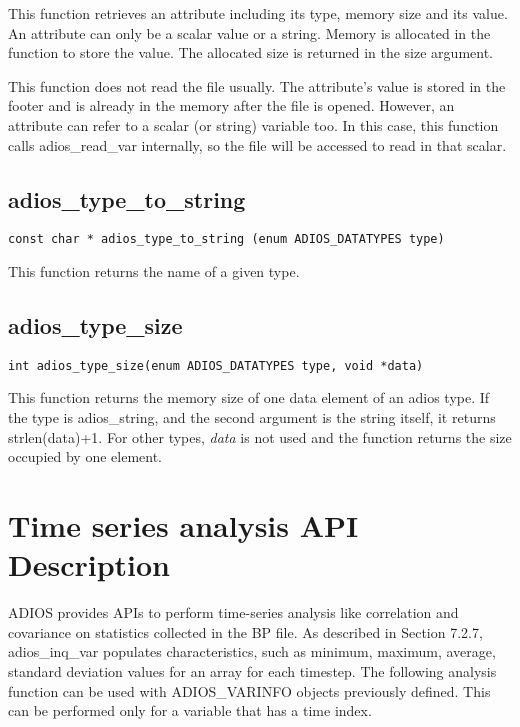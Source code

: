 \documentclass{report}
\begin{document}
This function retrieves an attribute including its type, memory size and its value. 
An attribute can only be a scalar value or a string. Memory is allocated in the 
function to store the value. The allocated size is returned in the size argument. 

This function does not read the file usually. The attribute's value is stored in 
the footer and is already in the memory after the file is opened. However, an attribute 
can refer to a scalar (or string) variable too. In this case, this function calls 
adios\_read\_var internally, so the file will be accessed to read in that scalar. 
\label{HToc182553409}

\subsection{adios\_type\_to\_string}

\begin{lstlisting}[]
const char * adios_type_to_string (enum ADIOS_DATATYPES type)
\end{lstlisting}

This function returns the name of a given type.\label{HToc182553410}

\subsection{adios\_type\_size}

\begin{lstlisting}[]
int adios_type_size(enum ADIOS_DATATYPES type, void *data)
\end{lstlisting}

This function returns the memory size of one data element of an adios type. If 
the type is adios\_string, and the second argument is the string itself, it returns 
strlen(data)+1. For other types, \textit{data} is not used and the function returns 
the size occupied by one element.\label{HToc182553411}

\section{Time series analysis API Description}

ADIOS provides APIs to perform time-series analysis like correlation and covariance 
on statistics collected in the BP file. As described in Section 7.2.7, adios\_inq\_var 
populates characteristics, such as minimum, maximum, average, standard deviation 
values for an array for each timestep. The following analysis function can be used 
with ADIOS\_VARINFO objects previously defined. This can be performed only for 
a variable that has a time index.\label{HToc182553412}
\end{document}
